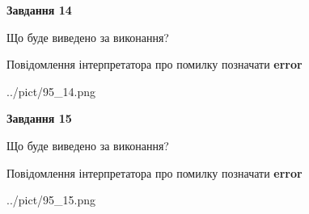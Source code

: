 \documentclass[11pt, ukrainian]{article}
\begin{document}
{\begin {large}
{\begin {center}\textbf{Завдання 14}\end {center}}\par
Що буде виведено за виконання? \par
Повідомлення інтерпретатора про помилку позначати \textbf{error}

\begin{center}
	{../pict/95_14.png}
\end{center}
\newpage

{\begin {center}\textbf{Завдання 15}\end {center}}\par
Що буде виведено за виконання? \par
Повідомлення інтерпретатора про помилку позначати \textbf{error}

\begin{center}
	{../pict/95_15.png}
\end{center}
\newpage

\end {large}}
\end{document}
